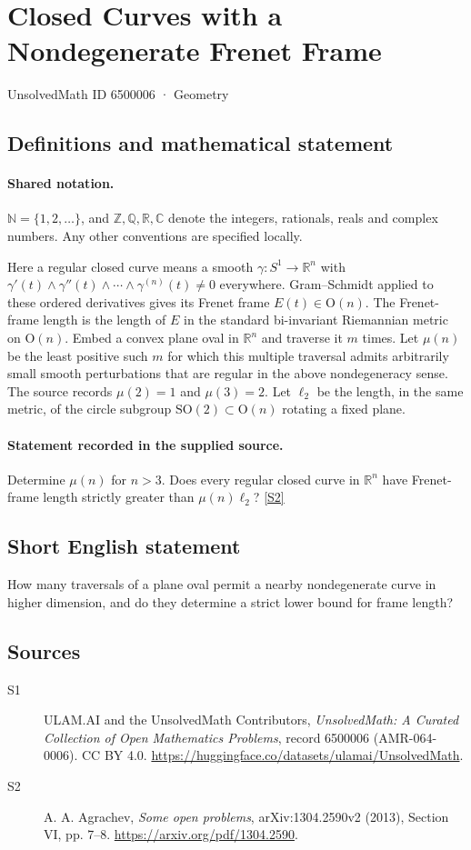 \documentclass[11pt]{article}
\newcommand{\sref}[2]{\hyperlink{source:#1:#2}{[S#2]}}
\begin{document}
\setcounter{section}{6500005}
\section{Closed Curves with a Nondegenerate Frenet Frame}\label{6500006}
{\small\sffamily UnsolvedMath ID 6500006 · Geometry}
\subsection{Definitions and mathematical statement}

\paragraph{Shared notation.}$\mathbb N=\{1,2,\ldots\}$, and $\mathbb Z,\mathbb Q,\mathbb R,\mathbb C$ denote the integers, rationals, reals and complex numbers. Any other conventions are specified locally.


Here a regular closed curve means a smooth $\gamma:S^1\to\mathbb R^n$ with $\gamma'(t)\wedge\gamma''(t)\wedge\cdots\wedge\gamma^{(n)}(t)\ne0$ everywhere. Gram--Schmidt applied to these ordered derivatives gives its Frenet frame $E(t)\in\mathrm O(n)$. The Frenet-frame length is the length of $E$ in the standard bi-invariant Riemannian metric on $\mathrm O(n)$. Embed a convex plane oval in $\mathbb R^n$ and traverse it $m$ times. Let $\mu(n)$ be the least positive such $m$ for which this multiple traversal admits arbitrarily small smooth perturbations that are regular in the above nondegeneracy sense. The source records $\mu(2)=1$ and $\mu(3)=2$. Let $\ell_2$ be the length, in the same metric, of the circle subgroup $\mathrm{SO}(2)\subset\mathrm O(n)$ rotating a fixed plane.
\paragraph{Statement recorded in the supplied source.}
Determine $\mu(n)$ for $n>3$. Does every regular closed curve in $\mathbb R^n$ have Frenet-frame length strictly greater than $\mu(n)\ell_2$? \sref{6500006}{2}
\subsection{Short English statement}
How many traversals of a plane oval permit a nearby nondegenerate curve in higher dimension, and do they determine a strict lower bound for frame length?
\subsection{Sources}
\begin{description}
\item[\hypertarget{source:6500006:1}{S1}] ULAM.AI and the UnsolvedMath Contributors, \emph{UnsolvedMath: A Curated Collection of Open Mathematics Problems}, record 6500006 (AMR-064-0006). CC BY 4.0. \url{https://huggingface.co/datasets/ulamai/UnsolvedMath}.
\item[\hypertarget{source:6500006:2}{S2}] A. A. Agrachev, \emph{Some open problems}, arXiv:1304.2590v2 (2013), Section VI, pp. 7--8. \url{https://arxiv.org/pdf/1304.2590}.
\end{description}
\label{end:6500006}
\end{document}

